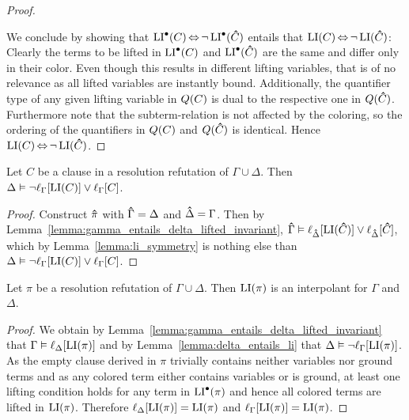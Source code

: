 \begin{proof}
\begin{itemize}
\begin{itemize}
	\end{itemize}

	\end{itemize}


	We conclude by showing that 
	$\operatorname{LI}^\bullet(C) \operatorname{\Leftrightarrow} \lnot \operatorname{LI}^\bullet(\bm\hat C)$ 
	entails that 
	$\operatorname{LI}(C) \operatorname{\Leftrightarrow} \lnot \operatorname{LI}(\bm\hat C)$:
	Clearly the terms to be lifted in $\operatorname{LI}^\bullet(C)$ and $\operatorname{LI}^\bullet(\bm\hat C)$ are the same and differ only in their color.
	Even though this results in different lifting variables, that is of no relevance as all lifted variables are instantly bound.
	Additionally, the quantifier type of any given lifting variable in $Q(C)$ is dual to the respective one in $Q(\bm\hat C)$.
	Furthermore note that the subterm-relation is not affected by the coloring, so the ordering of the quantifiers in $Q(C)$ and $Q(\bm\hat C)$ is identical.
	Hence 
	$\operatorname{LI}(C) \operatorname{\Leftrightarrow} \lnot \operatorname{LI}(\bm\hat C)$.
\end{proof}


\begin{lemma}
	\label{lemma:delta_entails_li}
	Let $C$ be a clause in a resolution refutation of $\Gamma \cup \Delta$.
	Then
	$\Delta \vDash \lnot\ell_{\Gamma}[\operatorname{LI}(C)] \lor \ell_{\Gamma}[C]$.
\end{lemma}
\begin{proof}
	Construct $\bm\hat \pi$ with $\bm\hat \Gamma = \Delta$ and $\bm\hat \Delta = \Gamma$. 
	Then by Lemma~\ref{lemma:gamma_entails_delta_lifted_invariant}, $\bm\hat \Gamma \vDash \ell_{\bm\hat \Delta}[\operatorname{LI}(\bm\hat C)] \lor \ell_{\bm\hat \Delta}[\bm\hat C]$, 
	which by Lemma~\ref{lemma:li_symmetry} is nothing else than
	$\Delta \vDash \lnot \ell_{\Gamma}[\operatorname{LI}(C)] \lor \ell_{\Gamma}[C]$.
\end{proof}

\begin{thm}
	Let $\pi$ be a resolution refutation of $\Gamma \cup \Delta$.
	Then $\operatorname{LI}(\pi)$ is an interpolant for $\Gamma$ and $\Delta$.
\end{thm}
\begin{proof}
	We obtain by Lemma~\ref{lemma:gamma_entails_delta_lifted_invariant} that  $\Gamma \vDash \ell_{\Delta}[\operatorname{LI}(\pi)]$ and
	by Lemma~\ref{lemma:delta_entails_li} that
	$\Delta \vDash \lnot\ell_{\Gamma}[\operatorname{LI}(\pi)]$.
	As the empty clause derived in $\pi$ trivially contains neither variables nor ground terms and as any colored term either contains variables or is ground, at least one lifting condition holds for any term in $\operatorname{LI}^\bullet(\pi)$ and hence all colored terms are lifted in $\operatorname{LI}(\pi)$.
	Therefore $\ell_{\Delta}[\operatorname{LI}(\pi)] = \operatorname{LI}(\pi)$ and $\ell_{\Gamma}[\operatorname{LI}(\pi)] = \operatorname{LI}(\pi)$.
\end{proof}

